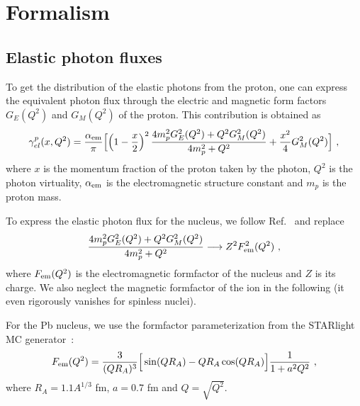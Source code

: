\section{Formalism}

\subsection{Elastic photon fluxes}

To get the distribution of the elastic photons from the proton, one can express the equivalent photon flux through
the electric and magnetic form factors $G_E(Q^2)$ and $G_M(Q^2)$ of the proton.
This contribution is obtained as
\begin{eqnarray}
  \gamma^{p}_{el}(x,Q^2) = \frac{\alpha_{\rm{em}}}{\pi}
\Big[ \Big( 1- {x \over 2} \Big)^2 \, {4 m_p^2 G_E^2(Q^2) + Q^2 G_M^2(Q^2) \over 4m_p^2 + Q^2} + {x^2 \over 4} G_M^2(Q^2) \Big]~,
\label{proton_el_flux}
\end{eqnarray}
where $x$ is the momentum fraction of the proton taken by the photon, $Q^2$ is the photon virtuality, $\alpha_{\rm{em}}$ is the electromagnetic structure constant and $m_p$ is the proton mass.

To express the elastic photon flux for the nucleus, we follow Ref.~\cite{Budnev:1974de} and replace 
\begin{eqnarray}
 {4 m_p^2 G_E^2(Q^2) + Q^2 G_M^2(Q^2) \over 4m_p^2 + Q^2} \longrightarrow Z^2 F_{\rm em}^2(Q^2)~,
 \end{eqnarray}
where $F_{\rm em}(Q^2)$ is the electromagnetic formfactor of the nucleus and $Z$ is its charge.
We also neglect the magnetic formfactor of the ion in the following (it even rigorously vanishes for spinless nuclei).

For the Pb nucleus, we use the formfactor parameterization from the STARlight MC generator~\cite{Klein:2016yzr}:
\begin{eqnarray}
 F_{\rm em}(Q^2) = {3 \over (QR_A)^3}\Big[ \sin(QR_A) - QR_A \cos(QR_A) \Big] { 1 \over 1 + a^2 Q^2}~,
\end{eqnarray}
where $R_A = 1.1 A^{1/3}$ fm, $a = 0.7$ fm and $Q = \sqrt{Q^2}$.

